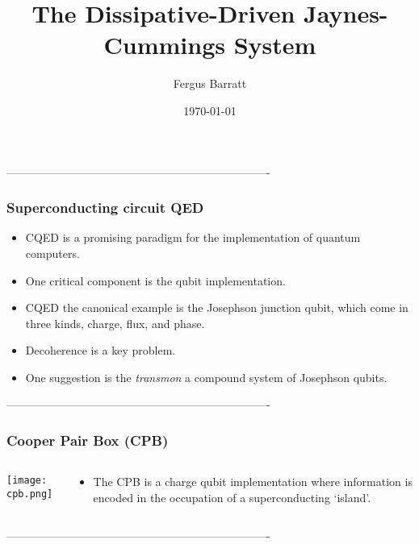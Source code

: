 \documentclass{beamer}
\title{The Dissipative-Driven Jaynes-Cummings System}
\date{\today}
\author{Fergus Barratt}
\begin{document}
\maketitle
----------------------------------------------------------------------
\begin{frame}
    \frametitle{Superconducting circuit QED}         
    \begin{itemize}
        \item CQED is a promising paradigm for the implementation of 
                quantum computers. 
        \item One critical component is the qubit implementation.
        \item CQED the canonical example is the Josephson junction 
                qubit, which come in three kinds, charge, flux, and 
                phase. 
        \item Decoherence is a key problem.
        \item One suggestion is the \emph{transmon}
                a compound system of Josephson qubits.
    \end{itemize}
\end{frame}
----------------------------------------------------------------------
\begin{frame}
    \frametitle{Cooper Pair Box (CPB)}
    \begin{columns}[c]
        \begin{column}{0.4\linewidth}
            \texttt{[image: cpb.png]}
        \end{column}
        \begin{column}{0.6\linewidth}
            \begin{itemize}
                \item The CPB is a charge qubit implementation where 
                    information is encoded in the occupation of a 
                    superconducting `island'.
            \end{itemize}
        \end{column}
    \end{columns}
\end{frame}
----------------------------------------------------------------------
\end{document}
